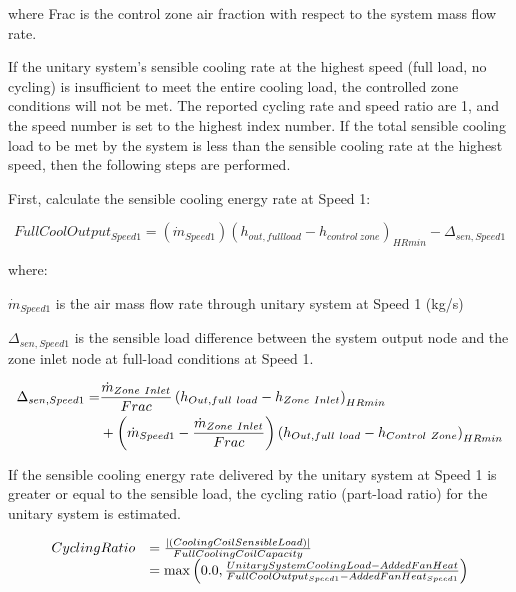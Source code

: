 where Frac is the control zone air fraction with respect to the system mass flow rate.

If the unitary system's sensible cooling rate at the highest speed (full load, no cycling) is insufficient to meet the entire cooling load, the controlled zone conditions will not be met. The reported cycling rate and speed ratio are 1, and the speed number is set to the highest index number. If the total sensible cooling load to be met by the system is less than the sensible cooling rate at the highest speed, then the following steps are performed.

First, calculate the sensible cooling energy rate at Speed 1:

\begin{equation}
FullCoolOutpu{t_{Speed1}} = ({\dot m_{Speed1}}){({h_{out,fullload}} - {h_{control~zone}})_{HRmin}} - {\Delta_{sen,Speed1}}
\end{equation}

where:

\emph{\({\dot m_{Speed1}}\)} is the air mass flow rate through unitary system at Speed 1 (kg/s)

\(\Delta_{sen,Speed1}\) is the sensible load difference between the system output node and the zone inlet node at full-load conditions at Speed 1.

\begin{equation}
  \begin{split}
    \Delta_{sen,Speed1} =& \frac{\dot{m}_{Zone~Inlet}}{Frac} \left(h_{Out,full~load} - h_{Zone~Inlet}\right)_{HRmin} \\
                              &+ \left(\dot{m}_{Speed1} - \frac{\dot{m}_{Zone~Inlet}}{Frac}\right) \left(h_{Out,full~load} - h_{Control~Zone}\right)_{HRmin}
  \end{split}
\end{equation}

If the sensible cooling energy rate delivered by the unitary system at Speed 1 is greater or equal to the sensible load, the cycling ratio (part-load ratio) for the unitary system is estimated.

\begin{equation}
  \begin{array}{rl}
    CyclingRatio &= \frac{ \left| \left(CoolingCoilSensibleLoad\right) \right| } {FullCoolingCoilCapacity} \\ 
                 &= \max \left(0.0,\frac{UnitarySystemCoolingLoad - AddedFanHeat}{FullCoolOutput_{Speed1} - AddedFanHeat_{Speed1}}\right)
  \end{array}
\end{equation}

